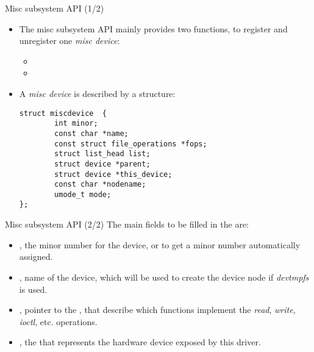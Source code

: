 \begin{frame}[fragile]{Misc subsystem API (1/2)}
  \begin{itemize}
  \item The misc subsystem API mainly provides two functions, to
    register and unregister one {\em misc device}:
    \begin{itemize}
    \item {}
    \item {}
    \end{itemize}
  \item A {\em misc device} is described by a 
    structure:
    \begin{verbatim}
struct miscdevice  {
        int minor;
        const char *name;
        const struct file_operations *fops;
        struct list_head list;
        struct device *parent;
        struct device *this_device;
        const char *nodename;
        umode_t mode;
};
\end{verbatim}
  \end{itemize}
\end{frame}

\begin{frame}[fragile]{Misc subsystem API (2/2)}
  The main fields to be filled in the  are:
  \begin{itemize}
  \item {}, the minor number for the device, or
     to get a minor number automatically
    assigned.
  \item {}, name of the device, which will be used to create
    the device node if {\em devtmpfs} is used.
  \item {}, pointer to the , that
    describe which functions implement the {\em read}, {\em write},
    {\em ioctl}, etc. operations.
  \item {}, the  that represents the
    hardware device exposed by this driver.
  \end{itemize}
\end{frame}

